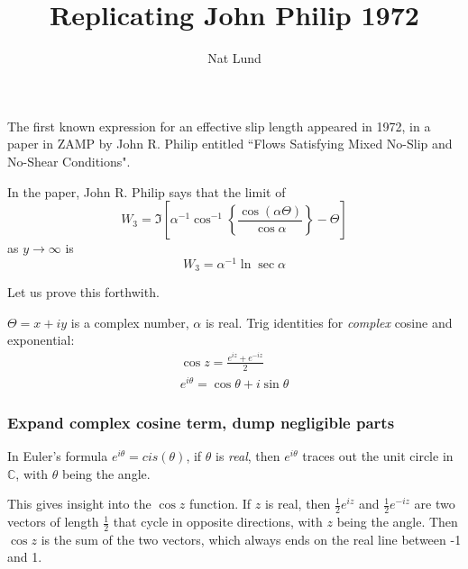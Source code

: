 \documentclass[a4paper]{report}
\title{Replicating John Philip 1972}
\author{Nat Lund}
\begin{document}
\maketitle

The first known expression for an effective slip length appeared in 1972, in a paper in ZAMP by John R. Philip entitled ``Flows Satisfying Mixed No-Slip and No-Shear Conditions".

In the paper, John R. Philip says that the limit of
\begin{equation}
W_{3} = \Im \left[  
 \alpha^{-1} \cos^{-1} 
 \left\{ \frac{\cos(\alpha \Theta)}{\cos \alpha} \right\} - \Theta
   \right]
\end{equation}
as $y\rightarrow \infty$ is
\begin{equation}
W_{3} = \alpha^{-1} \ln \sec \alpha
\end{equation}

Let us prove this forthwith.
\vspace*{1em}

$\Theta = x + iy$ is a complex number, $\alpha$ is real.  Trig identities for \emph{complex} cosine and exponential:
\begin{gather}
\cos z = \frac{e^{iz}+e^{-iz}}{2} \\
e^{i \theta} = \cos \theta + i \sin \theta 
\end{gather}

\subsubsection*{Expand complex cosine term, dump negligible parts}

In Euler's formula $e^{i\theta} = cis(\theta)$, if $\theta$ is \emph{real}, then $e^{i \theta}$ traces out the unit circle in $\mathbb{C}$, with $\theta$ being the angle.
\begin{center}
\end{center}

This gives insight into the $\cos z$ function.  If $z$ is real, then $\frac{1}{2} e^{iz}$ and $\frac{1}{2} e^{-iz}$ are two vectors of length $\frac{1}{2}$ that cycle in opposite directions, with $z$ being the angle. Then $\cos z$ is the sum of the two vectors, which always ends on the real line between -1 and 1. 
\end{document}
